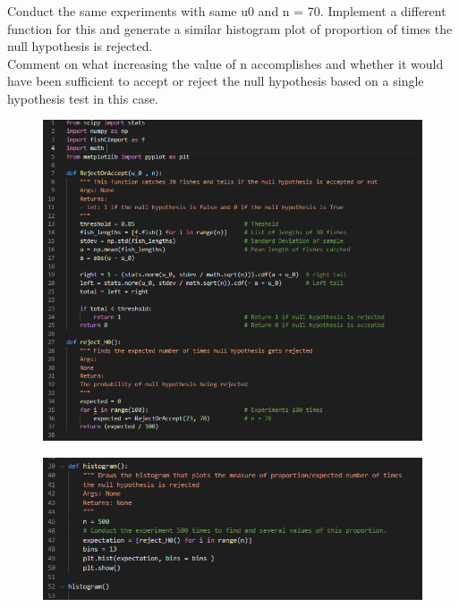 \documentclass[answers]{exam}
\begin{document}
\subsubsection{} Conduct the same experiments with same u0 and n = 70. Implement a different function for this and generate a similar histogram plot of proportion of times the null hypothesis is rejected.\\
Comment on what increasing the value of n accomplishes and whether it would have been sufficient to accept or reject the null hypothesis based on a single hypothesis test in this case.
\begin{framed}
    


\begin{figure}[H] %
    \centering
    \includegraphics[width= 1 \textwidth]{Q5.2.2_code_1.PNG}
\end{figure}

\begin{figure}[H] %
    \centering
    \includegraphics[width= 1 \textwidth]{Q5.2.2_code_2.PNG}
\end{figure}
    

\end{framed}
\end{document}
